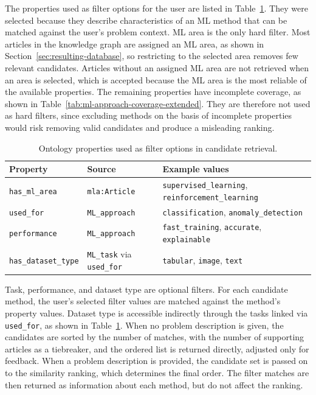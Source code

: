 The properties used as filter options for the user are listed in 
Table~\ref{tab:retrieval-properties}. They were selected because 
they describe characteristics of an ML method that can be matched 
against the user's problem context. ML area is the only hard filter. 
Most articles in the knowledge 
graph are assigned an ML area, as shown in 
Section~\ref{sec:resulting-database}, so restricting to the selected area 
removes few relevant candidates. Articles without an assigned ML 
area are not retrieved when an area is selected, which is 
accepted because the ML area is the most reliable of the available 
properties. The remaining properties have 
incomplete coverage, as shown in 
Table~\ref{tab:ml-approach-coverage-extended}. They are therefore 
not used as hard filters, since excluding methods on the basis of 
incomplete properties would risk removing valid candidates and 
produce a misleading ranking.

\begin{table}[H]
\centering
\caption[Ontology properties used in candidate retrieval]
{Ontology properties used as filter options in candidate retrieval.}
\label{tab:retrieval-properties}
\begin{tabularx}{\textwidth}{llX}
\toprule
\textbf{Property} & \textbf{Source} & \textbf{Example values} \\
\midrule
\texttt{has\_ml\_area} & \texttt{mla:Article} 
  & \texttt{supervised\_learning}, 
    \texttt{reinforcement\_learning} \\
\midrule
\texttt{used\_for} & \texttt{ML\_approach} 
  & \texttt{classification}, 
    \texttt{anomaly\_detection} \\
\midrule
\texttt{performance} & \texttt{ML\_approach} 
  & \texttt{fast\_training}, 
    \texttt{accurate}, 
    \texttt{explainable} \\
\midrule
\texttt{has\_dataset\_type} & \texttt{ML\_task} 
  via \texttt{used\_for}
  & \texttt{tabular}, 
    \texttt{image}, 
    \texttt{text} \\
\bottomrule
\end{tabularx}
\end{table}

Task, performance, and dataset type are optional filters. 
For each candidate method, the user's selected filter values 
are matched against the method's property values.
Dataset type is accessible indirectly through the tasks linked via 
\texttt{used\_for}, as shown in Table~\ref{tab:retrieval-properties}. 
When no problem description is given, the candidates are sorted by 
the number of matches, with the number of supporting articles as a 
tiebreaker, and the ordered list is returned directly, adjusted 
only for feedback. 
When a problem description is provided, the candidate set is passed on to 
the similarity ranking, which determines the final order. The 
filter matches are then returned as information about each method, 
but do not affect the ranking.


